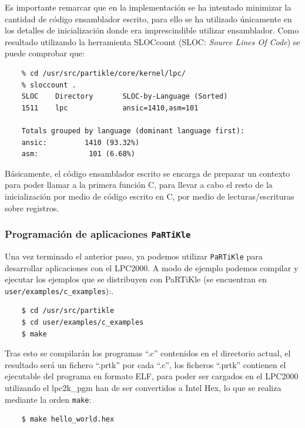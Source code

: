 \documentclass[10pt,a4paper]{article}
\newcommand{\partikle}[0]{\texttt{PaRTiKle}}
\begin{document}

	Es importante remarcar que en la implementación se ha intentado minimizar la cantidad de código ensamblador escrito, para ello se ha utilizado únicamente en los detalles de inicialización donde era imprescindible utilizar ensamblador.  Como resultado utilizando la herramienta SLOCcount (SLOC: \emph{Source Lines Of Code}) se puede comprobar que:

	\begin{verbatim}
	% cd /usr/src/partikle/core/kernel/lpc/
	% sloccount .
	SLOC    Directory       SLOC-by-Language (Sorted)
	1511    lpc             ansic=1410,asm=101
	
	Totals grouped by language (dominant language first):
	ansic:         1410 (93.32%)
	asm:            101 (6.68%)
	\end{verbatim}
	
	Básicamente, el código ensamblador escrito se encarga de preparar un contexto para poder llamar a la primera función C, para llevar a cabo el resto de la inicialización por medio de código escrito en C, por medio de lecturas/escrituras sobre registros.
		
	\subsubsection{Programación de aplicaciones \partikle{}}
	
	Una vez terminado el anterior paso, ya podemos utilizar \partikle{} para desarrollar aplicaciones con el LPC2000.
	A modo de ejemplo podemos compilar y ejecutar los ejemplos que se distribuyen con PaRTiKle (se encuentran en \texttt{user/\-examples/\-c\_examples}):.
	
	\begin{verbatim}
	$ cd /usr/src/partikle
	$ cd user/examples/c_examples
	$ make
	\end{verbatim}
	
	Tras esto se compilarán los programas ``.c'' contenidos en el directorio actual, el resultado será un fichero ``.prtk'' por cada ``.c'', los ficheros ``.prtk'' contienen el ejecutable del programa en formato ELF, para poder ser cargados en el LPC2000 utilizando el lpc2k\_pgm han de ser convertidos a Intel Hex, lo que se realiza mediante la orden \texttt{make}:

	\begin{verbatim}
	$ make hello_world.hex
	\end{verbatim}
	
\end{document}
